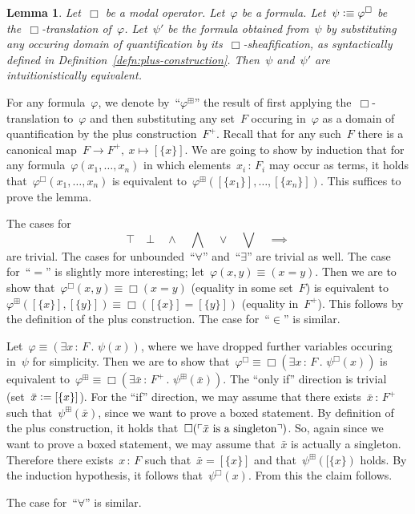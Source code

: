 \documentclass[10pt,reqno,a4paper]{amsbook}
\makeatletter
\theoremstyle{definition}
\theoremstyle{plain}
\newtheorem{lemma}[defn]{Lemma}
\theoremstyle{remark}
\newcommand{\?}{\,{:}\,}
\renewcommand{\_}{\mathpunct{.}\,}
\newcommand{\speak}[1]{\ulcorner\text{\textnormal{#1}}\urcorner}
\newcommand{\defeq}{\vcentcolon=}
\newcommand{\defequiv}{\vcentcolon\equiv}
\renewenvironment{proof}[1][\proofname]{\par
  \pushQED{\qed}%
  \normalfont \topsep6\p@\@plus6\p@\relax
  \trivlist
  \item[\hskip\labelsep
        \itshape
    #1\@addpunct{.}]\ignorespaces
}{%
  \popQED\endtrivlist\@endpefalse
}
\makeatother
\begin{document}
\begin{lemma}Let~$\Box$ be a modal operator. Let~$\varphi$ be a formula.
Let~$\psi \defequiv \varphi^\Box$ be the~$\Box$-translation of~$\varphi$.
Let~$\psi'$ be the formula obtained from~$\psi$ by substituting any occuring
domain of quantification by its~$\Box$-sheafification, as syntactically defined
in Definition~\ref{defn:plus-construction}. Then~$\psi$
and~$\psi'$ are intuitionistically equivalent.
\end{lemma}
\begin{proof}
For any formula~$\varphi$, we denote by~``$\varphi^\boxplus$'' the result of
first applying the~$\Box$-translation to~$\varphi$ and then substituting any
set~$F$ occuring in~$\varphi$ as a domain of quantification by the plus
construction~$F^+$. Recall that for any such~$F$ there is a canonical map~$F
\to F^+,\ x \mapsto [\{x\}]$. We are going to show by induction that for any
formula~$\varphi(x_1,\ldots,x_n)$ in which elements~$x_i\?F_i$ may occur as
terms, it holds that~$\varphi^\Box(x_1,\ldots,x_n)$ is equivalent
to~$\varphi^\boxplus([\{x_1\}],\ldots,[\{x_n\}])$. This suffices to prove the
lemma.

The cases for
\[ \top \quad \bot \quad \wedge \quad \bigwedge \quad \vee \quad \bigvee \quad \implies \]
are trivial. The cases for unbounded~``$\forall$'' and~``$\exists$'' are
trivial as well. The case for~``$=$'' is slightly more interesting; let~$\varphi(x,y)
\equiv (x = y)$. Then we are to show that~$\varphi^\Box(x,y) \equiv \Box(x=y)$
(equality in some set~$F$) is equivalent to~$\varphi^\boxplus([\{x\}],[\{y\}])
\equiv \Box([\{x\}] = [\{y\}])$ (equality in~$F^+$). This follows by the
definition of the plus construction. The case for~``$\in$'' is similar.

Let~$\varphi \equiv (\exists x\?F\_ \psi(x))$, where we have dropped further
variables occuring in~$\psi$ for simplicity. Then we are to show
that~$\varphi^\Box \equiv \Box(\exists x\?F\_ \psi^\Box(x))$ is equivalent
to~$\varphi^\boxplus \equiv \Box(\exists \bar x\?F^+\_ \psi^\boxplus(\bar x))$.
The ``only if'' direction is trivial (set~$\bar x \defeq [\{x\}]$). For the ``if''
direction, we may assume that there exists~$\bar x\?F^+$ such
that~$\psi^\boxplus(\bar x)$, since we want to prove a boxed statement. By
definition of the plus construction, it holds that~$\Box(\speak{$\bar x$ is a
singleton})$. So, again since we want to prove a boxed statement, we may assume
that~$\bar x$ is actually a singleton. Therefore there exists~$x\?F$ such
that~$\bar x = [\{x\}]$ and that~$\psi^\boxplus([\{x\})$ holds. By the induction
hypothesis, it follows that~$\psi^\Box(x)$. From this the claim follows.

The case for~``$\forall$'' is similar.
\end{proof}
\end{document}
